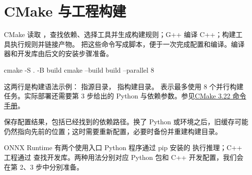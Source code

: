 \section{CMake 与工程构建}
CMake 读取 ，查找依赖、选择工具并生成构建规则；G++ 编译 C++；构建工具执行规则并链接产物。 把这些命令写成脚本，便于一次完成配置和编译。编译器和开发库由后文的安装步骤准备。

\begin{command}
cmake -S . -B build
cmake --build build --parallel 8
\end{command}
这两行是构建语法示例： 指源目录， 指构建目录。 表示最多使用 8 个并行构建任务。实际部署还需要第 3 步给出的 Python 与依赖参数。参见\href{https://cmake.org/cmake/help/v3.22/manual/cmake.1.html}{CMake 3.22 命令手册}。

 保存配置结果，包括已经找到的依赖路径。换了 Python 或环境之后，旧缓存可能仍然指向先前的位置；这时需要重新配置，必要时备份并重建构建目录。

\begin{concept}{ONNX Runtime 有两个使用入口}
Python 程序通过 pip 安装的  执行推理；C++ 工程通过  查找开发库。两种用法分别对应 Python 包和 C++ 开发配置，我们会在第 2、3 步中分别准备。
\end{concept}
